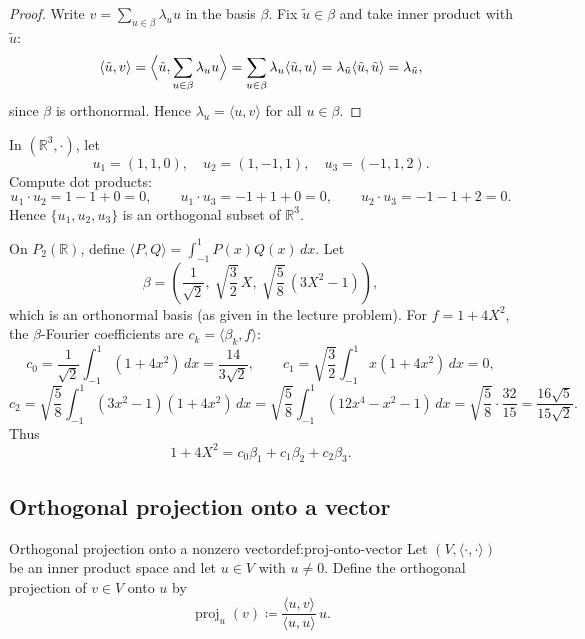 \begin{proof}
Write $v=\sum_{u\in\beta}\lambda_u u$ in the basis $\beta$. Fix $\tilde u\in\beta$ and take inner product with $\tilde u$:
\[
\langle \tilde u,v\rangle=\Bigl\langle \tilde u,\sum_{u\in\beta}\lambda_u u\Bigr\rangle=\sum_{u\in\beta}\lambda_u\langle \tilde u,u\rangle
=\lambda_{\tilde u}\langle \tilde u,\tilde u\rangle=\lambda_{\tilde u},
\]
since $\beta$ is orthonormal. Hence $\lambda_u=\langle u,v\rangle$ for all $u\in\beta$.
\end{proof}

\begin{examplebox}[title={Worked Example (Lecture Week 11): checking orthogonality in $\mathbb{R}^3$}]
In $(\mathbb{R}^3,\cdot)$, let
\[
u_1=(1,1,0),\quad u_2=(1,-1,1),\quad u_3=(-1,1,2).
\]
Compute dot products:
\[
u_1\cdot u_2=1-1+0=0,\qquad
u_1\cdot u_3=-1+1+0=0,\qquad
u_2\cdot u_3=-1-1+2=0.
\]
Hence $\{u_1,u_2,u_3\}$ is an orthogonal subset of $\mathbb{R}^3$.
\end{examplebox}

\begin{examplebox}[title={Worked Example (Lecture Week 11): Fourier coefficients in $P_2(\mathbb{R})$}]
On $P_2(\mathbb{R})$, define $\langle P,Q\rangle=\int_{-1}^{1}P(x)Q(x)\,dx$.
Let
\[
\beta=\left(\frac{1}{\sqrt2},\ \sqrt{\frac32}\,X,\ \sqrt{\frac{5}{8}}\,(3X^2-1)\right),
\]
which is an orthonormal basis (as given in the lecture problem). For $f=1+4X^2$,
the $\beta$-Fourier coefficients are $c_k=\langle \beta_k,f\rangle$:
\[
c_0=\frac{1}{\sqrt2}\int_{-1}^1 (1+4x^2)\,dx=\frac{14}{3\sqrt2},\qquad
c_1=\sqrt{\frac32}\int_{-1}^1 x(1+4x^2)\,dx=0,
\]
\[
c_2=\sqrt{\frac{5}{8}}\int_{-1}^1 (3x^2-1)(1+4x^2)\,dx
=\sqrt{\frac{5}{8}}\int_{-1}^1 (12x^4-x^2-1)\,dx
=\sqrt{\frac{5}{8}}\cdot \frac{32}{15}
=\frac{16\sqrt5}{15\sqrt2}.
\]
Thus
\[
1+4X^2=c_0\beta_1+c_1\beta_2+c_2\beta_3.
\]
\end{examplebox}

\subsection{Orthogonal projection onto a vector}

\begin{definition}{Orthogonal projection onto a nonzero vector}{def:proj-onto-vector}
Let $(V,\langle\cdot,\cdot\rangle)$ be an inner product space and let $u\in V$ with $u\neq 0$.
Define the orthogonal projection of $v\in V$ onto $u$ by
\[
\operatorname{proj}_u(v)\coloneqq \frac{\langle u,v\rangle}{\langle u,u\rangle}\,u.
\]
\end{definition}

